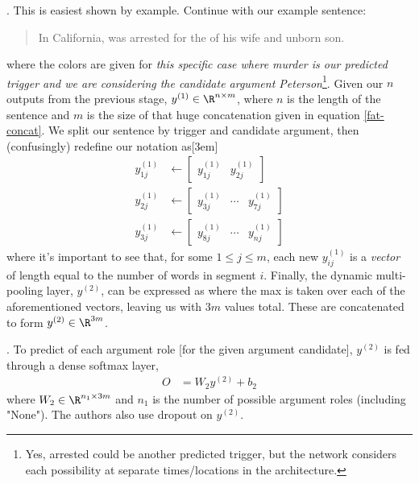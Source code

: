 \documentclass[11pt]{article}
\newcommand\myspace[1][]{\vspace{#1\bigskipamount}}
\newcommand\p{\Needspace{10\baselineskip} \noindent}
\begin{document}
\myspace
\p {}. This is easiest shown by example. Continue with our example sentence:
\begin{quote}
	In California,  was arrested for the  of his wife and unborn son.
\end{quote}
where the colors are given for \textit{this specific case where murder is our predicted trigger and we are considering the candidate argument Peterson}\footnote{Yes, arrested could be another predicted trigger, but the network considers each possibility at separate times/locations in the architecture.}. Given our $n$ outputs from the previous stage, $y^{(1)} \in \R^{n \times m}$, where $n$ is the length of the sentence and $m$ is the size of that huge concatenation given in equation \ref{fat-concat}. We split our sentence by trigger and candidate argument, then (confusingly) redefine our notation as[3em]
\begin{align}
	{y}^{(1)}_{1j} &\leftarrow \begin{bmatrix} y^{(1)}_{1j} & y^{(1)}_{2j} \end{bmatrix} \\
	{y}^{(1)}_{2j} &\leftarrow \begin{bmatrix} y^{(1)}_{3j} & \cdots & y^{(1)}_{7j} \end{bmatrix} \\
	{y}^{(1)}_{3j} &\leftarrow \begin{bmatrix} y^{(1)}_{8j} & \cdots & y^{(1)}_{nj} \end{bmatrix} 
\end{align}
where it's important to see that, for some $1 \le j \le m$, each new $y^{(1)}_{ij}$ is a \textit{vector} of length equal to the number of words in segment $i$. Finally, the dynamic multi-pooling layer, $y^{(2)}$, can be expressed as 
where the max is taken over each of the aforementioned vectors, leaving us with $ 3m $ values total. These are concatenated to form $y^{(2)} \in \R^{3m}$. 


\myspace
\p {}. To predict of each argument role [for the given argument candidate], $y^{(2)}$ is fed through a dense softmax layer,
\begin{align}
	O &= W_2 y^{(2)} + b_2
\end{align}
where $W_2 \in \R^{n_1 \times 3m}$ and $n_1$ is the number of possible argument roles (including "None"). The authors also use dropout on $y^{(2)}$.
\end{document}
